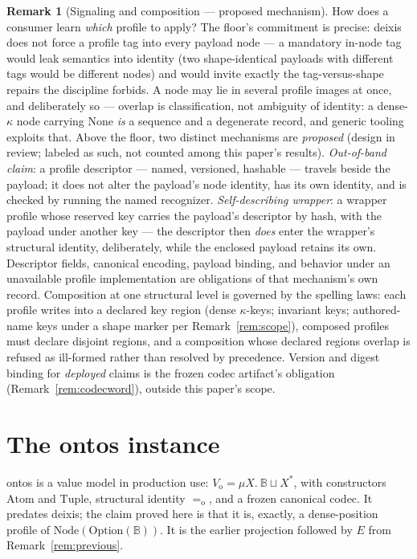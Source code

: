 \documentclass[11pt]{article}
\theoremstyle{definition}
\newtheorem{remark}[theorem]{Remark}
\newcommand{\Bytes}{\mathbb{B}}                    %
\newcommand{\NodeT}[1]{\mathrm{Node}(#1)}
\newcommand{\VO}{V_{\mathrm{o}}}                   %
\newcommand{\Atom}{\mathrm{Atom}}
\newcommand{\Tup}{\mathrm{Tuple}}
\newcommand{\eqO}{=_{\mathrm{o}}}
\begin{document}
\begin{remark}[Signaling and composition --- proposed mechanism]\label{rem:signal}
How does a consumer learn \emph{which} profile to apply? The floor's commitment is
precise: deixis does not force a profile tag into every payload node --- a mandatory
in-node tag would leak semantics into identity (two shape-identical payloads with
different tags would be different nodes) and would invite exactly the
tag-versus-shape repairs the discipline forbids. A node may lie in several profile
images at once, and deliberately so --- overlap is classification, not ambiguity of
identity: a dense-$\kappa$ node carrying $\mathrm{None}$ \emph{is} a sequence and a degenerate
record, and
generic tooling exploits that. Above the floor, two distinct mechanisms are
\emph{proposed} (design in review; labeled as such, not counted among this paper's
results). \emph{Out-of-band claim}: a profile descriptor --- named, versioned,
hashable --- travels beside the payload; it does not alter the payload's node
identity, has its own identity, and is checked by running the named recognizer.
\emph{Self-describing wrapper}: a wrapper profile whose reserved key carries the
payload's descriptor by hash, with the payload under another key --- the descriptor
then \emph{does} enter the wrapper's structural identity, deliberately, while the
enclosed payload retains its own. Descriptor fields, canonical encoding, payload
binding, and behavior under an unavailable profile implementation are obligations of
that mechanism's own record. Composition at one structural level is governed by the
spelling laws: each profile writes into a declared key region (dense $\kappa$-keys;
invariant keys; authored-name keys under a shape marker per Remark~\ref{rem:scope}),
composed profiles must declare disjoint regions, and a composition whose declared
regions overlap is refused as ill-formed rather than resolved by precedence. Version
and digest binding for \emph{deployed} claims is the frozen codec artifact's
obligation (Remark~\ref{rem:codecword}), outside this paper's scope.
\end{remark}

\section{The ontos instance}\label{sec:ontos}

ontos is a value model in production use: $\VO = \mu X.\ \Bytes \sqcup X^{*}$, with
constructors $\Atom$ and $\Tup$, structural identity $\eqO$, and a frozen canonical
codec. It predates deixis; the claim proved here is that it is, exactly, a
dense-position profile of $\NodeT{\mathrm{Option}(\Bytes)}$. It is the earlier
projection followed by $E$ from Remark~\ref{rem:previous}.
\end{document}
